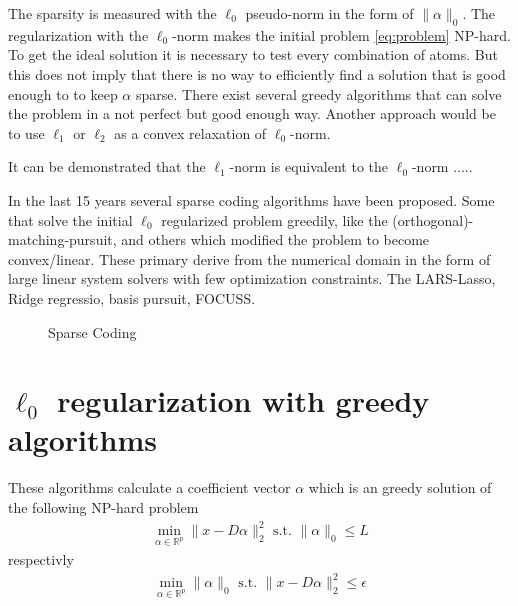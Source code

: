 The sparsity is measured with the $\ell_0$ pseudo-norm in the form of $\lVert\alpha\rVert_{0}$.
The regularization with the $\ell_0$-norm makes the initial problem \ref{eq:problem} NP-hard.
To get the ideal solution it is necessary to test every combination of atoms.
But this does not imply that there is no way to efficiently find a solution that is good enough to
to keep $\alpha$ sparse. There exist several greedy algorithms that can solve the problem in a not perfect but
good enough way. Another approach would be to use $\ell_1$ or $\ell_2$ as a convex relaxation of $\ell_0$-norm.

It can be demonstrated that the $\ell_1$-norm is equivalent to the $\ell_0$-norm .....

In the last 15 years several sparse coding algorithms have been proposed. 
Some that solve the initial $\ell_0$ regularized problem greedily, like the (orthogonal)-matching-pursuit,
and others which modified the problem to become convex/linear. These primary derive from the numerical domain in the form of 
large linear system solvers with few optimization constraints. The LARS-Lasso, Ridge regressio, basis pursuit, FOCUSS.



\begin{figure}
\centering
\caption{Sparse Coding}
\label{fig:da_x}
\end{figure}






\section{$\ell_0$ regularization with greedy algorithms}

These algorithms calculate a coefficient vector $\alpha$ which is an greedy solution of the following NP-hard problem
\begin{align}
\min_{\alpha\in\mathbb{R}^{p}}  \lVert x - D\alpha \rVert^{2}_{2} \textrm{ s.t. } \lVert \alpha \rVert_{0} \leq L
\end{align}
respectivly
\begin{align}
\min_{\alpha\in\mathbb{R}^{p}}   \lVert \alpha \rVert_{0}   \textrm{ s.t. } \lVert x - D\alpha \rVert^{2}_{2} \leq \epsilon
\end{align}
\cite{Mallat1993}


